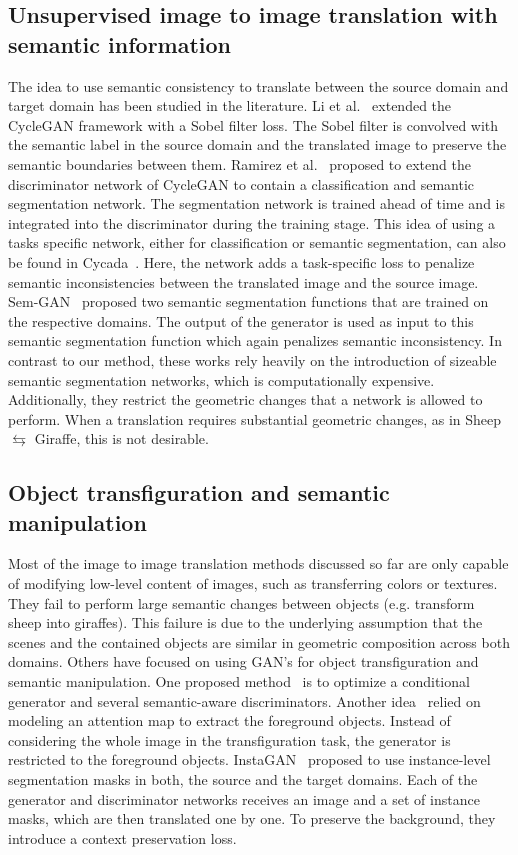 \subsection{Unsupervised image to image translation with semantic information}
The idea to use semantic consistency to translate between the source domain and target domain has been studied in the literature. Li et al.~\cite{li_semantic-aware_2018} extended the CycleGAN framework with a Sobel filter loss. The Sobel filter is convolved with the semantic label in the source domain and the translated image to preserve the semantic boundaries between them. Ramirez et al.~\cite{ramirez_exploiting_2018} proposed to extend the discriminator network of CycleGAN to contain a classification and semantic segmentation network. The segmentation network is trained ahead of time and is integrated into the discriminator during the training stage. This idea of using a tasks specific network, either for classification or semantic segmentation, can also be found in Cycada~\cite{hoffman_cycada:_2017}. Here, the network adds a task-specific loss to penalize semantic inconsistencies between the translated image and the source image. Sem-GAN~\cite{cherian_sem-gan:_2018} proposed two semantic segmentation functions that are trained on the respective domains. The output of the generator is used as input to this semantic segmentation function which again penalizes semantic inconsistency.
In contrast to our method, these works rely heavily on the introduction of sizeable semantic segmentation networks, which is computationally expensive. Additionally, they restrict the geometric changes that a network is allowed to perform. When a translation requires substantial geometric changes, as in Sheep $\leftrightarrows$ Giraffe, this is not desirable.

\subsection{Object transfiguration and semantic manipulation}
Most of the image to image translation methods discussed so far are only capable of modifying low-level content of images, such as transferring colors or textures. They fail to perform large semantic changes between objects (e.g. transform sheep into giraffes). This failure is due to the underlying assumption that the scenes and the contained objects are similar in geometric composition across both domains. Others have focused on using GAN's for object transfiguration and semantic manipulation. One proposed method~\cite{liang_generative_2017} is to optimize a conditional generator and several semantic-aware discriminators. Another idea~\cite{alami_mejjati_unsupervised_2018} relied on modeling an attention map to extract the foreground objects. Instead of considering the whole image in the transfiguration task, the generator is restricted to the foreground objects. InstaGAN~\cite{mo_instance-aware_2019} proposed to use instance-level segmentation masks in both, the source and the target domains. Each of the generator and discriminator networks receives an image and a set of instance masks, which are then translated one by one. To preserve the background, they introduce a context preservation loss. 

